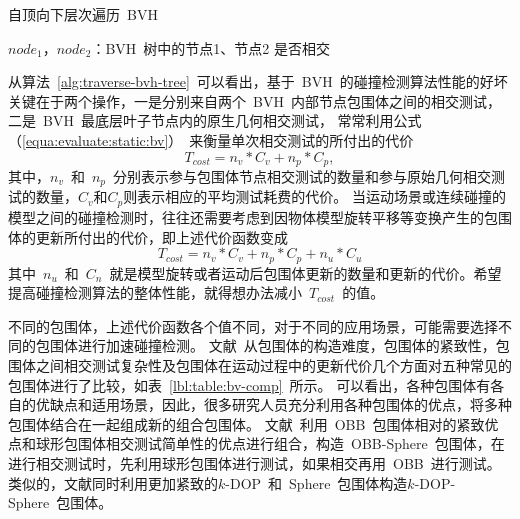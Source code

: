 \begin{algorithm}
\small
\caption{自顶向下层次遍历~BVH~}
\label{alg:traverse-bvh-tree}
\begin{algorithmic}[1]
\Require
$node_1$，$node_2$：BVH~树中的节点1、节点2
\Ensure
是否相交
    \State {} 
  \Else
               
           \Else
              \State {} 
              \EndFor
           \EndIf
      \Else
           \State {}  
           \EndFor
      \EndIf
  \EndIf
\EndFunction
\end{algorithmic}
\end{algorithm}
从算法~\ref{alg:traverse-bvh-tree}~可以看出，基于~BVH~的碰撞检测算法性能的好坏关键在于两个操作，一是分别来自两个~BVH~内部节点包围体之间的相交测试，二是~BVH~最底层叶子节点内的原生几何相交测试，
常常利用公式（\ref{equa:evaluate:static:bv}）~来衡量单次相交测试的所付出的代价
\begin{equation}
T_{cost} = n_v * C_v + n_p * C_p,
\label{equa:evaluate:static:bv}
\end{equation}
其中，$n_v$~和~$n_p$~分别表示参与包围体节点相交测试的数量和参与原始几何相交测试的数量，$C_v$和$C_p$则表示相应的平均测试耗费的代价\cite{klosowski1998efficient}。
当运动场景或连续碰撞的模型之间的碰撞检测时，往往还需要考虑到因物体模型旋转平移等变换产生的包围体的更新所付出的代价，即上述代价函数变成
\begin{equation}
T_{cost} = n_v * C_v + n_p * C_p + n_u * C_u
  \label{equa:evaluate:dynamic:bv}
\end{equation}
其中~$n_u$~和~$C_n$~就是模型旋转或者运动后包围体更新的数量和更新的代价。希望提高碰撞检测算法的整体性能，就得想办法减小~$T_{cost}$~的值。

不同的包围体，上述代价函数各个值不同，对于不同的应用场景，可能需要选择不同的包围体进行加速碰撞检测。
文献~从包围体的构造难度，包围体的紧致性，包围体之间相交测试复杂性及包围体在运动过程中的更新代价几个方面对五种常见的包围体进行了比较，如表~\ref{lbl:table:bv-comp}~所示。
可以看出，各种包围体有各自的优缺点和适用场景，因此，很多研究人员充分利用各种包围体的优点，将多种包围体结合在一起组成新的组合包围体。
文献~利用~OBB~包围体相对的紧致优点和球形包围体相交测试简单性的优点进行组合，构造~OBB-Sphere~包围体，在进行相交测试时，先利用球形包围体进行测试，如果相交再用~OBB~进行测试。
类似的，文献同时利用更加紧致的$k$-DOP~和~Sphere~包围体构造$k$-DOP-Sphere~包围体。

